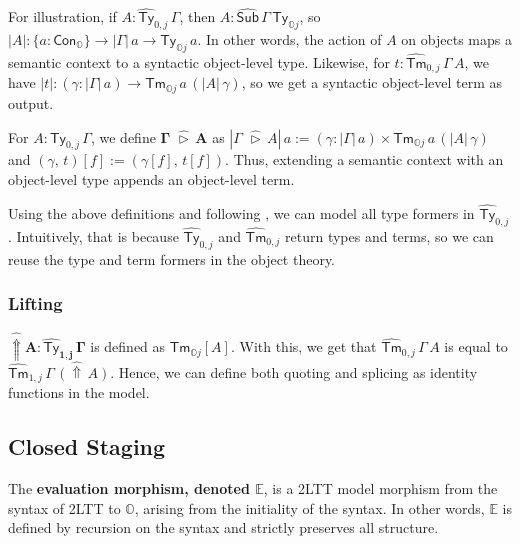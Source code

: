 \documentclass[acmsmall]{acmart}
\newcommand{\msf}[1]{\mathsf{#1}}
\newcommand{\mbb}[1]{\mathbb{#1}}
\newcommand{\bs}[1]{\boldsymbol{#1}}
\newcommand{\wh}[1]{\widehat{#1}}
\newcommand{\ext}{\triangleright}
\newcommand{\Lift}{{\Uparrow}}
\newcommand{\mbbo}{\mbb{O}}
\newcommand{\Ty}{\msf{Ty}}
\newcommand{\Tm}{\msf{Tm}}
\newcommand{\Cono}{\msf{Con}_{\mbbo}}
\newcommand{\hSub}{\wh{\msf{Sub}}}
\newcommand{\hTy}{\wh{\msf{Ty}}}
\newcommand{\hTm}{\wh{\msf{Tm}}}
\newcommand{\hato}{\bm\hat{\mbbo}}
\newcommand{\ev}{\mbb{E}}
\theoremstyle{remark}
\begin{document}
For illustration, if $A : \hTy_{0,j}\,\Gamma$, then $A :
\hSub\,\Gamma\,\Ty_{\mbbo j}$, so $|A| : \{a : \Cono\} \to |\Gamma|\,a \to
\Ty_{\mbbo j}\,a$. In other words, the action of $A$ on objects maps a semantic
context to a syntactic object-level type. Likewise, for $t :
\hTm_{0,j}\,\Gamma\,A$, we have $|t| : (\gamma : |\Gamma|\,a) \to \Tm_{\mbbo
  j}\,a\,(|A|\,\gamma)$, so we get a syntactic object-level term as output.

\begin{definition} For $A : \Ty_{0,j}\,\Gamma$, we define $\bs{\Gamma\,\,\wh{\ext}\,A}$
as $|\Gamma\,\,\wh{\ext}\,A|\,a := (\gamma : |\Gamma|\,a) \times \Tm_{\mbbo
  j}\,a\,(|A|\,\gamma)$ and $(\gamma,\,t)[f] := (\gamma[f],\,t[f])$. Thus,
extending a semantic context with an object-level type appends an object-level
term.
\end{definition}

Using the above definitions and following \cite{twolevel}, we can model all type
formers in $\hTy_{0,j}$. Intuitively, that is because $\hTy_{0,j}$ and
$\hTm_{0,j}$ return types and terms, so we can reuse the type and term formers
in the object theory.

\subsubsection{Lifting}

\begin{definition}\label{def:psh-lifting}
$\bs{\wh{\Lift} A : \hTy_{1,j}\,\Gamma}$ is defined as $\Tm_{\mbbo j}[A]$. With
  this, we get that $\hTm_{0,j}\,\Gamma\,A$ is equal to
  $\hTm_{1,j}\,\Gamma\,(\wh{\Lift}\,A)$. Hence, we can define both quoting and
  splicing as identity functions in the model.
\end{definition}

\subsection{Closed Staging}

\begin{definition} The \textbf{evaluation morphism, denoted $\bs{\ev}$}, is
a 2LTT model morphism from the syntax of 2LTT to $\hato$, arising from the initiality
of the syntax. In other words, $\ev$ is defined by recursion on the syntax and
strictly preserves all structure.
\end{definition}
\end{document}
